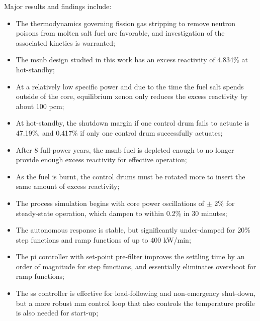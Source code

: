 Major results and findings include:
\begin{itemize}
    \item The thermodynamics governing fission gas stripping to remove neutron poisons from molten salt fuel are favorable, and investigation of the associated kinetics is warranted;
    \item The \acs{msnb} design studied in this work has an excess reactivity of 4.834\% at hot-standby;
    \item At a relatively low specific power and due to the time the fuel salt spends outside of the core, equilibrium xenon only reduces the excess reactivity by about 100 pcm;
    \item At hot-standby, the shutdown margin if one control drum fails to actuate is 47.19\%, and 0.417\% if only one control drum successfully actuates;
    \item After 8 full-power years, the \acs{msnb} fuel is depleted enough to no longer provide enough excess reactivity for effective operation;
    \item As the fuel is burnt, the control drums must be rotated more to insert the same amount of excess reactivity;
    \item The process simulation begins with core power oscillations of $\pm$ 2\% for steady-state operation, which dampen to within 0.2\% in 30 minutes;
    \item The autonomous response is stable, but significantly under-damped for 20\% step functions and ramp functions of up to 400 kW/min;
    \item The \acs{pi} controller with set-point pre-filter improves the settling time by an order of magnitude for step functions, and essentially eliminates overshoot for ramp functions;
    \item The \acs{ss} controller is effective for load-following and non-emergency shut-down, but a more robust \acs{mm} control loop that also controls the temperature profile is also needed for start-up;
\end{itemize}